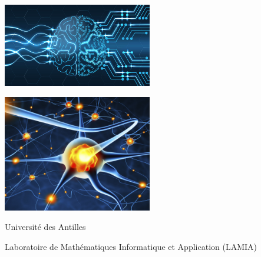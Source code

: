 \begin{titlepage}
    \enlargethispage{2cm}

    \begin{center}
        \vspace*{1cm}
        \includegraphics[width=6.5cm]{./images/Garde.jpg}
        \vspace*{0.5cm}

        \textsc{\@title}
        \HRule
        \vspace*{0.5cm}

        \large{\@author}
    \end{center}

    \begin{center}
      \vspace*{2cm}
      \includegraphics[width=6.5cm]{./images/n_a.jpg}
    \end{center}

    \vspace*{2cm}

    \begin{center}
        Université des Antilles

        Laboratoire de Mathématiques Informatique et Application (LAMIA)
    \end{center}

\end{titlepage}
\ClearShipoutPicture
